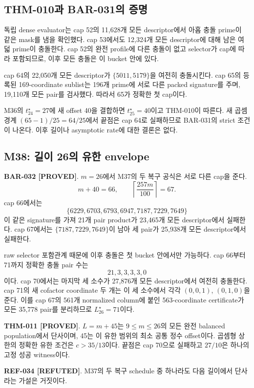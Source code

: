 \documentclass[11pt]{article}
\newcommand{\claimstatus}[2]{\textbf{#1 [#2]}}
\begin{document}
\subsection{THM-010과 BAR-031의 증명}

독립 dense evaluator는 cap 52의 11,628개 모든 descriptor에서 아홉
충돌 prime이 같은 mask를 냄을 확인했다. cap 53에서도 12,324개 모든
descriptor에 대해 남은 여덟 prime이 충돌한다. cap 52의 완전
profile에 다른 충돌이 없고 selector가 cap에 따라 포함되므로, 이후
모든 충돌은 이 bucket 안에 있다.

cap 64의 22,050개 모든 descriptor가 \(\{5011,5179\}\)을 여전히
충돌시킨다. cap 65의 등록된 169-coordinate sublist는
196개 prime에 서로 다른 packed signature를 주며, 19,110개 모든
pair를 검사했다. 따라서 65가 정확한 첫 cap이다.

M36의 \(t_{24}^\star=27\)에 새 offset 40을 결합하면
\(t_{25}^\star=40\)이고 THM-010이 따른다. 새 곱셈 경계
\((65-1)/25=64/25\)에서 끝점은 cap 64로 실패하므로 BAR-031의 strict
조건이 나온다. 이후 길이나 asymptotic rate에 대한 결론은 없다.

\subsection{M38: 길이 26의 유한 envelope}

\claimstatus{BAR-032}{PROVED}.
\(m=26\)에서 M37의 두 복구 공식은 서로 다른 cap을 준다.
\[
m+40=66,\qquad
\left\lceil\frac{257m}{100}\right\rceil=67.
\]
cap 66에서는
\[
\{6229,6703,6793,6947,7187,7229,7649\}
\]
이 같은 signature를 가져 21개 pair product가 23,465개 모든
descriptor에서 실패한다. cap 67에서는
\(\{7187,7229,7649\}\)이 남아 세 pair가 25,938개 모든
descriptor에서 실패한다.

raw selector 포함관계 때문에 이후 충돌은 첫 bucket 안에서만
가능하다. cap 66부터 71까지 정확한 충돌 pair 수는
\[
21,3,3,3,3,0
\]
이다. cap 70에서는 마지막 세 소수가 27,876개 모든 descriptor에서
여전히 충돌한다. cap 71의 새 cofactor coordinate 두 개는 이 세
소수에서 각각 \((0,0,1)\), \((0,1,0)\)을 준다. 이를 cap 67의
561개 normalized column에 붙인 563-coordinate certificate가 모든
35,778 pair를 분리하므로 \(L_{26}^\star=71\)이다.

\claimstatus{THM-011}{PROVED}.
\(L=m+45\)는 \(9\le m\le26\)의 모든 완전 balanced population에서
단사이며, 45는 이 유한 범위의 최소 공통 정수 offset이다. 곱셈형
상한의 정확한 유한 조건은 \(c>35/13\)이다. 끝점은 cap 70으로
실패하고 \(27/10\)은 하나의 고정 성공 witness이다.

\claimstatus{REF-034}{REFUTED}.
M37의 두 복구 schedule 중 하나라도 다음 길이에서 단사라는 가설은
거짓이다.
\end{document}
